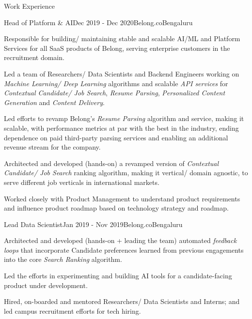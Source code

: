 \documentclass{resume} %
\begin{document}
\begin{rSection}{Work Experience}

\begin{rSubsection}{Head of Platform \& AI}{Dec 2019 - Dec 2020}{Belong.co}{Bengaluru}
\item Responsible for building/ maintaining stable and scalable AI/ML and Platform Services for all SaaS products of Belong, serving enterprise customers in the recruitment domain.
\item Led a team of Researchers/ Data Scientists and Backend Engineers working on {\em Machine Learning/ Deep Learning} algorithms and scalable {\em API services} for {\em Contextual Candidate/ Job Search}, {\em Resume Parsing}, {\em Personalized Content Generation} and {\em Content Delivery}.
\item Led efforts to revamp Belong's {\em Resume Parsing} algorithm and service, making it scalable, with performance metrics at par with the best in the industry, ending dependence on paid third-party parsing services and enabling an additional revenue stream for the company.
\item Architected and developed (hands-on) a revamped version of  {\em Contextual Candidate/ Job Search} ranking algorithm, making it vertical/ domain agnostic, to serve different job verticals in international markets.
\item Worked closely with Product Management to understand product requirements and influence product roadmap based on technology strategy and roadmap.

\end{rSubsection}

\begin{rSubsection}{Lead Data Scientist}{Jan 2019 - Nov 2019}{Belong.co}{Bengaluru}
\item Architected and developed (hands-on + leading the team) automated {\em feedback loops} that incorporate Candidate preferences learned from previous engagements into the core {\em Search Ranking} algorithm.
\item Led the efforts in experimenting and building AI tools for a candidate-facing product under development. 
\item Hired, on-boarded and mentored Researchers/ Data Scientists and Interns; and led campus recruitment efforts for tech hiring.
\end{rSubsection}


\end{rSection}
\end{document}
